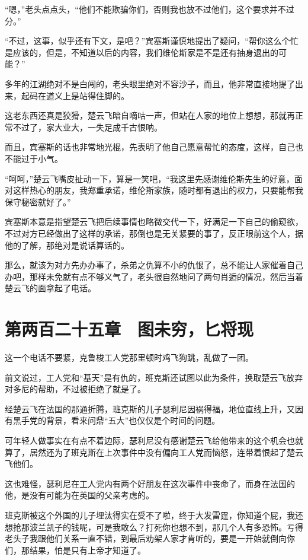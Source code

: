 “嗯，”老头点点头，“他们不能欺骗你们，否则我也放不过他们，这个要求并不过分。”

“不过，这事，似乎还有下文，是吧？”宾塞斯谨慎地提出了疑问，“帮你这么个忙是应该的，但是，不知道以后的内容，我们维伦斯家是不是还有抽身退出的可能？”

多年的江湖绝对不是白闯的，老头眼里绝对不容沙子，而且，他非常直接地提了出来，起码在道义上是站得住脚的。

这老东西还真是狡猾，楚云飞暗自嘀咕一声，但站在人家的地位上想想，那就再正常不过了，家大业大，一失足成千古恨呐。

而且，宾塞斯的话也非常地光棍，先表明了他自己愿意帮忙的态度，这样，自己也不能过于小气。

“呵呵，”楚云飞嘴皮扯动一下，算是一笑吧，“我这里先感谢维伦斯先生的好意，面对这样热心的朋友，我郑重承诺，维伦斯家族，随时都有退出的权力，只要能帮我保守秘密就好了。”

宾塞斯本意是指望楚云飞把后续事情也略微交代一下，好满足一下自己的偷窥欲，不过对方已经做出了这样的承诺，那倒也是无关紧要的事了，反正眼前这个人，据他的了解，那绝对是说话算话的。

那么，就该为对方先办办事了，杀弟之仇算不小的仇恨了，总不能让人家催着自己办吧，那样未免就有点不够义气了，老头很自然地问了两句肖逅的情况，然后当着楚云飞的面拿起了电话。

\section{第两百二十五章　图未穷，匕将现}

这一个电话不要紧，克鲁梭工人党那里顿时鸡飞狗跳，乱做了一团。

前文说过，工人党和“基天”是有仇的，班克斯还试图以此为条件，换取楚云飞放弃对多尼的帮助，不过被拒绝了就是了。

经楚云飞在法国的那通折腾，班克斯的儿子瑟利尼因祸得福，地位直线上升，又因有黑手党的背景，看来问鼎“五大”也仅仅是个时间的问题。

可年轻人做事实在有点不着边际，瑟利尼没有感谢楚云飞给他带来的这个机会也就算了，居然还为了班克斯在上次事件中没有偏向工人党而恼怒，连带着恨起了楚云飞他们。

这也难怪，瑟利尼在工人党内有两个好朋友在这次事件中丧命了，而身在法国的他，是没有可能为在英国的父亲考虑的。

班克斯被这个外国的儿子埋汰得实在受不了啦，终于大发雷霆，你知道个屁，我还想抢那波兰凯子的钱呢，可是我敢么？打死你也想不到，那几个人有多恐怖。亏得老头子我跟他们关系一直不错，到最后劝架人家才肯听的，要是一开始就倒向你们，那结果，怕是只有上帝才知道了。

